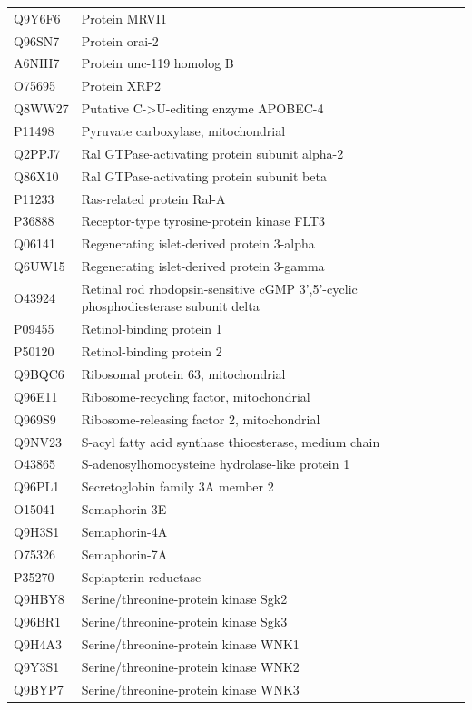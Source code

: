 \documentclass[10pt,twoside]{article}
\begin{document}
\begin{longtable}{lL{0.75\textwidth}}
Q9Y6F6	&	Protein MRVI1 	\\
Q96SN7	&	Protein orai-2 	\\
A6NIH7	&	Protein unc-119 homolog B	\\
O75695	&	Protein XRP2	\\
Q8WW27	&	Putative C->U-editing enzyme APOBEC-4 	\\
P11498	&	Pyruvate carboxylase, mitochondrial 	\\
Q2PPJ7	&	Ral GTPase-activating protein subunit alpha-2 	\\
Q86X10	&	Ral GTPase-activating protein subunit beta 	\\
P11233	&	Ras-related protein Ral-A	\\
P36888	&	Receptor-type tyrosine-protein kinase FLT3 	\\
Q06141	&	Regenerating islet-derived protein 3-alpha 	\\
Q6UW15	&	Regenerating islet-derived protein 3-gamma 	\\
O43924	&	Retinal rod rhodopsin-sensitive cGMP 3',5'-cyclic phosphodiesterase subunit delta 	\\
P09455	&	Retinol-binding protein 1 	\\
P50120	&	Retinol-binding protein 2 	\\
Q9BQC6	&	Ribosomal protein 63, mitochondrial 	\\
Q96E11	&	Ribosome-recycling factor, mitochondrial 	\\
Q969S9	&	Ribosome-releasing factor 2, mitochondrial 	\\
Q9NV23	&	S-acyl fatty acid synthase thioesterase, medium chain 	\\
O43865	&	S-adenosylhomocysteine hydrolase-like protein 1 	\\
Q96PL1	&	Secretoglobin family 3A member 2 	\\
O15041	&	Semaphorin-3E	\\
Q9H3S1	&	Semaphorin-4A 	\\
O75326	&	Semaphorin-7A 	\\
P35270	&	Sepiapterin reductase 	\\
Q9HBY8	&	Serine/threonine-protein kinase Sgk2 	\\
Q96BR1	&	Serine/threonine-protein kinase Sgk3 	\\
Q9H4A3	&	Serine/threonine-protein kinase WNK1 	\\
Q9Y3S1	&	Serine/threonine-protein kinase WNK2 	\\
Q9BYP7	&	Serine/threonine-protein kinase WNK3 	\\

\end{longtable}
\end{document}
